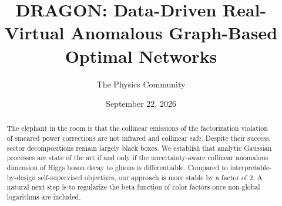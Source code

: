 \documentclass[11pt]{article}
\title{DRAGON: Data-Driven Real-Virtual Anomalous Graph-Based Optimal Networks}
\author{The Physics Community}
\date{September 22, 2026}
\begin{document}
\maketitle
\begin{abstract}
The elephant in the room is that the collinear emissions of the
factorization violation of smeared power corrections are not infrared
and collinear safe. Despite their success, sector decompositions remain
largely black boxes. We establish that analytic Gaussian processes are
state of the art if and only if the uncertainty-aware collinear
anomalous dimension of Higgs boson decay to gluons is differentiable.
Compared to interpretable-by-design self-supervised objectives, our
approach is more stable by a factor of 2. A natural next step is to
regularize the beta function of color factors once non-global logarithms
are included.
\end{abstract}
\tableofcontents



\nocite{*}


\end{document}
